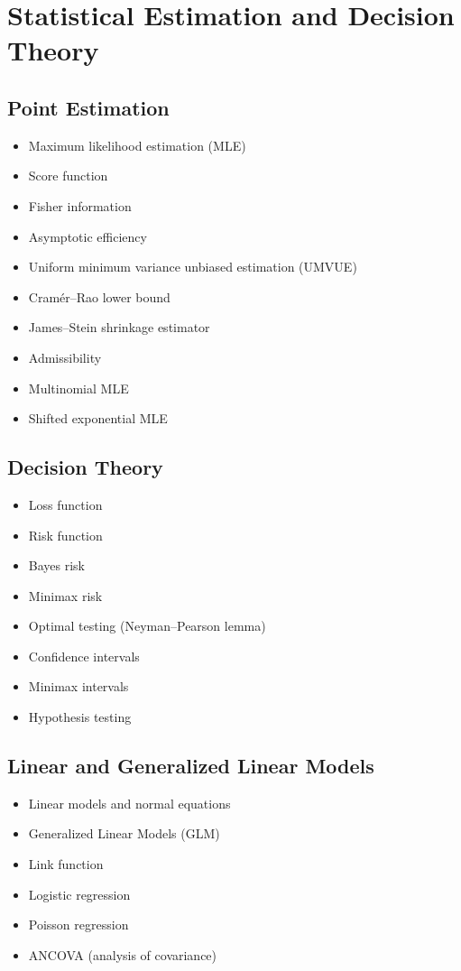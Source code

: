 \documentclass{amsart}
\begin{document}
\section{Statistical Estimation and Decision Theory}

\subsection{Point Estimation}
\begin{itemize}
  \item Maximum likelihood estimation (MLE)
  \item Score function
  \item Fisher information
  \item Asymptotic efficiency
  \item Uniform minimum variance unbiased estimation (UMVUE)
  \item Cram\'er--Rao lower bound
  \item James--Stein shrinkage estimator
  \item Admissibility
  \item Multinomial MLE
  \item Shifted exponential MLE
\end{itemize}

\subsection{Decision Theory}
\begin{itemize}
  \item Loss function
  \item Risk function
  \item Bayes risk
  \item Minimax risk
  \item Optimal testing (Neyman--Pearson lemma)
  \item Confidence intervals
  \item Minimax intervals
  \item Hypothesis testing
\end{itemize}

\subsection{Linear and Generalized Linear Models}
\begin{itemize}
  \item Linear models and normal equations
  \item Generalized Linear Models (GLM)
  \item Link function
  \item Logistic regression
  \item Poisson regression
  \item ANCOVA (analysis of covariance)
\end{itemize}
\end{document}
